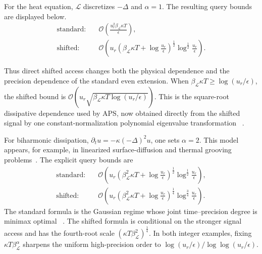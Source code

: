 \documentclass[aps,pra,reprint,floatfix,unsortedaddress,superscriptaddress]{revtex4-2}
\newcommand{\Ocal}{\mathcal{O}}
\begin{document}
\begin{samepage}
For the heat equation, $\mathcal L$ discretizes $-\Delta$ and
$\alpha=1$.  The resulting query bounds are displayed below.
\begin{equation}
\begin{aligned}
\text{standard:}\quad
&\Ocal\!\left(
\frac{u_r^2\beta_{\mathcal L}\kappa T}{\epsilon}
\right),
\\[2mm]
\text{shifted:}\quad
&\Ocal\!\left(
u_r\left(
\beta_{\mathcal L}\kappa T
+\log\frac{u_r}{\epsilon}
\right)^{\frac{1}{2}}
\log^{\frac{1}{2}}\!\frac{u_r}{\epsilon}
\right).
\end{aligned}
\label{eq:heat_application_queries}
\end{equation}
\end{samepage}
Thus direct shifted access changes both the physical dependence and the
precision dependence of the standard even extension.  When
$\beta_{\mathcal L}\kappa T\geq\log(u_r/\epsilon)$, the shifted bound is
$\Ocal(u_r\sqrt{\beta_{\mathcal L}\kappa T\log(u_r/\epsilon)})$.
This is the square-root dissipative dependence used by APS, now obtained
directly from the shifted signal by one constant-normalization polynomial
eigenvalue transformation
~\cite{aggarwal2022optimaldegree,
low2017hamiltoniansimulationuniformspectral,
hu2026quantumsimulationnonunitarydynamics}.

For biharmonic dissipation,
$\partial_tu=-\kappa(-\Delta)^2u$, one sets $\alpha=2$.  This model
appears, for example, in linearized surface-diffusion and thermal
grooving problems~\cite{mullins1957thermal}.  The explicit query bounds
are
\begin{equation}
\begin{aligned}
\text{standard:}\quad
&\Ocal\!\left(
u_r\left(
\beta_{\mathcal L}^{2}\kappa T
+\log\frac{u_r}{\epsilon}
\right)^{\frac{1}{2}}
\log^{\frac{1}{2}}\!\frac{u_r}{\epsilon}
\right),
\\[2mm]
\text{shifted:}\quad
&\Ocal\!\left(
u_r\left(
\beta_{\mathcal L}^{2}\kappa T
+\log\frac{u_r}{\epsilon}
\right)^{\frac{1}{4}}
\log^{\frac{3}{4}}\!\frac{u_r}{\epsilon}
\right).
\end{aligned}
\label{eq:biharmonic_application_queries}
\end{equation}
The standard formula is the Gaussian regime whose joint
time--precision degree is minimax optimal
~\cite{aggarwal2022optimaldegree}.  The shifted formula is conditional
on the stronger signal access and has the fourth-root scale
$(\kappa T\beta_{\mathcal L}^{2})^{\frac{1}{4}}$.  In both integer
examples, fixing $\kappa T\beta_{\mathcal L}^{\alpha}$ sharpens the
uniform high-precision order to
$\log(u_r/\epsilon)/\log\log(u_r/\epsilon)$.
\end{document}
